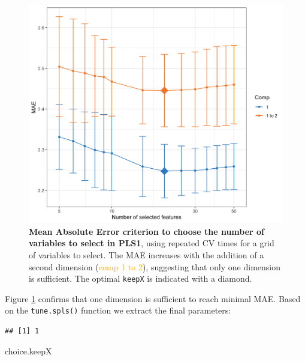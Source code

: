 \documentclass[]{book}
\newenvironment{Shaded}{\begin{snugshade}}{\end{snugshade}}
\newcommand{\CommentTok}[1]{\textcolor[rgb]{0.56,0.35,0.01}{\textit{#1}}}
\newcommand{\DecValTok}[1]{\textcolor[rgb]{0.00,0.00,0.81}{#1}}
\newcommand{\NormalTok}[1]{#1}
\newcommand{\OperatorTok}[1]{\textcolor[rgb]{0.81,0.36,0.00}{\textbf{#1}}}
\newcommand{\StringTok}[1]{\textcolor[rgb]{0.31,0.60,0.02}{#1}}
\begin{document}
\begin{figure}

{\centering \includegraphics[width=0.5\linewidth]{Figures/PLS/spls1-MAE-1} 

}

\caption{\textbf{Mean Absolute Error criterion to choose the number of variables to select in PLS1}, using repeated CV times for a grid of variables to select. The MAE increases with the addition of a second dimension (\textcolor{orange}{comp 1 to 2}), suggesting that only one dimension is sufficient. The optimal \texttt{keepX} is indicated with a diamond.}\label{fig:spls1-MAE}
\end{figure}



Figure \ref{fig:spls1-MAE} confirms that one dimension is sufficient to reach minimal MAE. Based on the \texttt{tune.spls()} function we extract the final parameters:

\begin{Shaded}
\end{Shaded}

\begin{verbatim}
## [1] 1
\end{verbatim}

\begin{Shaded}
\begin{Highlighting}[]
\NormalTok{choice.keepX}
\end{Highlighting}
\end{Shaded}
\end{document}

